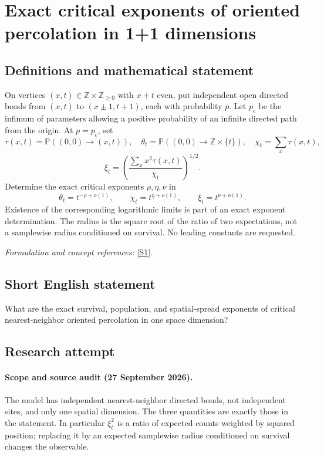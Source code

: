 \documentclass[11pt]{article}
\begin{document}
\section*{\texorpdfstring{Exact critical exponents of oriented percolation in 1+1 dimensions}{Exact critical exponents of oriented percolation in 1+1 dimensions}}\label{30006949}
\subsection{Definitions and mathematical statement}
On vertices $(x,t)\in{\mathbb{Z}}\times{\mathbb{Z}}_{\ge0}$ with $x+t$ even, put independent open directed bonds from $(x,t)$ to $(x\pm1,t+1)$, each with probability $p$. Let $p_c$ be the infimum of parameters allowing a positive probability of an infinite directed path from the origin. At $p=p_c$, set
\[
 \tau(x,t)={\mathbb{P}}((0,0)\to(x,t)),\quad
 \theta_t={\mathbb{P}}((0,0)\to{\mathbb{Z}}\times\{t\}),\quad
 \chi_t=\sum_x\tau(x,t),
\]
\[
 \xi_t=\left(\frac{\sum_xx^2\tau(x,t)}{\chi_t}\right)^{1/2}.
\]
Determine the exact critical exponents $\rho,\eta,\nu$ in
\[
 \theta_t=t^{-\rho+o(1)},\qquad
 \chi_t=t^{\eta+o(1)},\qquad \xi_t=t^{\nu+o(1)}.
\]
Existence of the corresponding logarithmic limits is part of an exact exponent determination. The radius is the square root of the ratio of two expectations, not a samplewise radius conditioned on survival. No leading constants are requested.
\par\smallskip\textit{Formulation and concept references:} \href{https://arxiv.org/abs/1709.08291}{[S1]}.

\subsection{Short English statement}
What are the exact survival, population, and spatial-spread exponents of critical nearest-neighbor oriented percolation in one space dimension?
\subsection{Research attempt}
\paragraph{Scope and source audit (27 September 2026).}
The model has independent nearest-neighbor directed bonds, not independent
sites, and only one spatial dimension. The three quantities are exactly
those in the statement. In particular $\xi_t^2$ is a ratio of expected
counts weighted by squared position; replacing it by an expected samplewise
radius conditioned on survival changes the observable.
\end{document}
